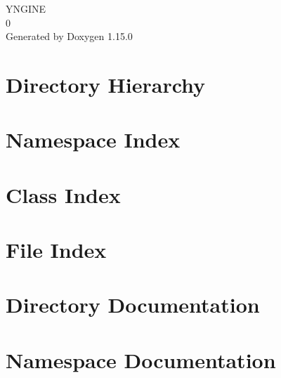 \documentclass[twoside]{book}
\newcommand{\+}{\discretionary{\mbox{\scriptsize$\hookleftarrow$}}{}{}}
\newcommand{\clearemptydoublepage}{%
    \newpage{\pagestyle{empty}\cleardoublepage}%
  }
\begin{document}
  \raggedbottom
    \hypersetup{pageanchor=false,
                bookmarksnumbered=true,
                pdfencoding=unicode
               }
  \begin{titlepage}
  \vspace*{7cm}
  \begin{center}%
  {\Large YNGINE}\\
  [1ex]\large 0 \\
  \vspace*{1cm}
  {\large Generated by Doxygen 1.15.0}\\
  \end{center}
  \end{titlepage}
  \clearemptydoublepage
  \tableofcontents
  \clearemptydoublepage
  \hypersetup{pageanchor=true}
\chapter{Directory Hierarchy}

\chapter{Namespace Index}

\chapter{Class Index}

\chapter{File Index}

\chapter{Directory Documentation}




\chapter{Namespace Documentation}









\end{document}
